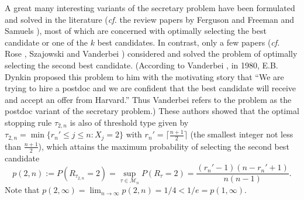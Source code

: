\documentclass[12pt, A4paper, oneside]{article}
\theoremstyle{plain}
\numberwithin{equation}{section}
\begin{document}
A great many interesting variants of the secretary problem have been formulated and solved in the literature
({\it cf.} the review papers by Ferguson \cite{ref4} and Freeman \cite{ref6} and  Samuels \cite{ref19}), most of which are concerned with optimally
selecting the best candidate or one of the $k$ best candidates. In contrast, only a few papers ({\it cf.} Rose \cite{ref16}, Szajowski \cite{ref26}
and Vanderbei \cite{ref21}) considered and solved the problem of optimally selecting the second best candidate.
(According to Vanderbei \cite{ref21}, in 1980, E.B. Dynkin proposed this problem to him with the motivating story that ``We are
trying to hire a postdoc and we are confident that the best candidate will receive and accept an offer from Harvard.'' Thus Vanderbei \cite{ref21}
refers to the problem as the postdoc variant of the secretary problem.)
These authors showed that the optimal stopping rule
$\tau_{2,n}$ is also of threshold type given by $\tau_{2,n}=\min\{r_n' \le j \le n: X_j=2\}$ with $r_n'=\lceil\frac{n+1}{2}\rceil$
(the smallest integer not less than $\frac{n+1}{2}$), which attains
the maximum probability of selecting the second best candidate
$$p(2,n):=P(R_{\tau_{2,n}}=2)=\sup_{\tau \in \mathcal{M}_n} P(R_{\tau}=2)=\frac{(r_n'-1)(n-r_n'+1)}{n(n-1)}.$$
Note that $p(2,\infty)=\lim_{n \to \infty} p(2,n)=1/4<1/e=p(1,\infty)$.
\end{document}
